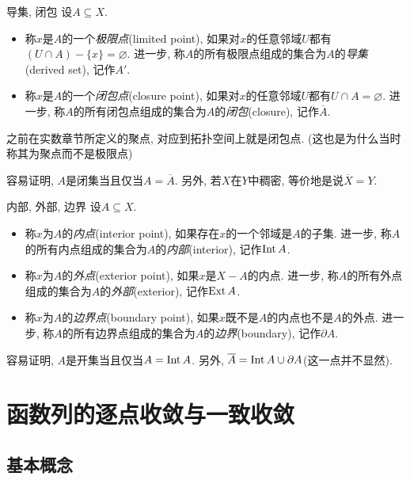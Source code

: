 \begin{definition}{导集, 闭包}
	设$A \subseteq X$. 
	\begin{itemize}
		\item 称$x$是$A$的一个\textit{极限点}(limited point), 如果对$x$的任意邻域$U$都有$(U \cap A) - \{ x \} = \varnothing$. 进一步, 称$A$的所有极限点组成的集合为$A$的\textit{导集}(derived set), 记作$A'$. 
		\item 称$x$是$A$的一个\textit{闭包点}(closure point), 如果对$x$的任意邻域$U$都有$U \cap A = \varnothing$. 进一步, 称$A$的所有闭包点组成的集合为$A$的\textit{闭包}(closure), 记作$\overline{A}$. 
	\end{itemize}
\end{definition}
\begin{remark}
	之前在实数章节所定义的聚点, 对应到拓扑空间上就是闭包点. (这也是为什么当时称其为聚点而不是极限点)
\end{remark}

容易证明, $A$是闭集当且仅当$A=\overline{A}$. 另外, 若$X$在$Y$中稠密, 等价地是说$\overline{X}=Y$. 

\begin{definition}{内部, 外部, 边界}
	设$A \subseteq X$. 
	\begin{itemize}
		\item 称$x$为$A$的\textit{内点}(interior point), 如果存在$x$的一个邻域是$A$的子集. 进一步, 称$A$的所有内点组成的集合为$A$的\textit{内部}(interior), 记作$\operatorname{Int} A$. 
		\item 称$x$为$A$的\textit{外点}(exterior point), 如果$x$是$X-A$的内点. 进一步, 称$A$的所有外点组成的集合为$A$的\textit{外部}(exterior), 记作$\operatorname{Ext} A$. 
		\item 称$x$为$A$的\textit{边界点}(boundary point), 如果$x$既不是$A$的内点也不是$A$的外点. 进一步, 称$A$的所有边界点组成的集合为$A$的\textit{边界}(boundary), 记作$\partial A$. 
	\end{itemize}
\end{definition}

容易证明, $A$是开集当且仅当$A= \operatorname{Int} A$. 另外, $\overline{A} = \operatorname{Int} A \cup \partial A$(这一点并不显然). 



\newpage
\section{函数列的逐点收敛与一致收敛}

\subsection{基本概念}

